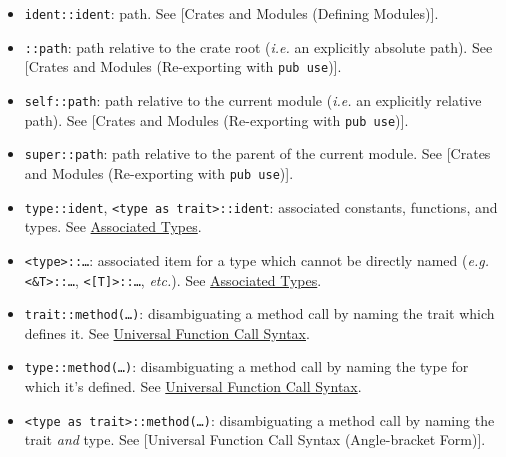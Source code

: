 \documentclass[a4paper,]{book}
\providecommand{\tightlist}{%
  \setlength{\itemsep}{0pt}\setlength{\parskip}{0pt}}
\begin{document}
\begin{itemize}
\tightlist
\item
  \texttt{ident::ident}: path. See {[}Crates and Modules (Defining
  Modules){]}.
\item
  \texttt{::path}: path relative to the crate root (\emph{i.e.} an
  explicitly absolute path). See {[}Crates and Modules (Re-exporting
  with \texttt{pub\ use}){]}.
\item
  \texttt{self::path}: path relative to the current module (\emph{i.e.}
  an explicitly relative path). See {[}Crates and Modules (Re-exporting
  with \texttt{pub\ use}){]}.
\item
  \texttt{super::path}: path relative to the parent of the current
  module. See {[}Crates and Modules (Re-exporting with
  \texttt{pub\ use}){]}.
\item
  \texttt{type::ident},
  \texttt{\textless{}type\ as\ trait\textgreater{}::ident}: associated
  constants, functions, and types. See
  \protect\hyperlink{sec--associated-types}{Associated Types}.
\item
  \texttt{\textless{}type\textgreater{}::\ldots{}}: associated item for
  a type which cannot be directly named (\emph{e.g.}
  \texttt{\textless{}\&T\textgreater{}::\ldots{}},
  \texttt{\textless{}{[}T{]}\textgreater{}::\ldots{}}, \emph{etc.}). See
  \protect\hyperlink{sec--associated-types}{Associated Types}.
\item
  \texttt{trait::method(\ldots{})}: disambiguating a method call by
  naming the trait which defines it. See
  \protect\hyperlink{sec--ufcs}{Universal Function Call Syntax}.
\item
  \texttt{type::method(\ldots{})}: disambiguating a method call by
  naming the type for which it's defined. See
  \protect\hyperlink{sec--ufcs}{Universal Function Call Syntax}.
\item
  \texttt{\textless{}type\ as\ trait\textgreater{}::method(\ldots{})}:
  disambiguating a method call by naming the trait \emph{and} type. See
  {[}Universal Function Call Syntax (Angle-bracket Form){]}.
\end{itemize}
\end{document}
